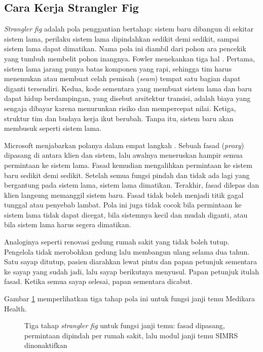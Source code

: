 \subsection{Cara Kerja Strangler Fig}

\textit{Strangler fig} adalah pola penggantian bertahap: sistem baru dibangun di sekitar sistem
lama, perilaku sistem lama dipindahkan sedikit demi sedikit, sampai sistem lama dapat dimatikan.
Nama pola ini diambil dari pohon ara pencekik yang tumbuh membelit pohon inangnya. Fowler menekankan
tiga hal \cite{c14-fowler-strangler}. Pertama, sistem lama jarang punya batas komponen yang rapi,
sehingga tim harus menemukan atau membuat celah pemisah (\textit{seam}) tempat satu bagian dapat
diganti tersendiri. Kedua, kode sementara yang membuat sistem lama dan baru dapat hidup berdampingan,
yang disebut arsitektur transisi, adalah biaya yang sengaja dibayar karena menurunkan risiko dan
mempercepat nilai. Ketiga, struktur tim dan budaya kerja ikut berubah. Tanpa itu, sistem baru akan
membusuk seperti sistem lama.

Microsoft menjabarkan polanya dalam empat langkah \cite{c14-azure-strangler}. Sebuah fasad
(\textit{proxy}) dipasang di antara klien dan sistem, lalu awalnya meneruskan hampir semua
permintaan ke sistem lama. Fasad kemudian mengalihkan permintaan ke sistem baru sedikit demi
sedikit. Setelah semua fungsi pindah dan tidak ada lagi yang bergantung pada sistem lama, sistem
lama dimatikan. Terakhir, fasad dilepas dan klien langsung memanggil sistem baru. Fasad tidak boleh
menjadi titik gagal tunggal atau penyebab lambat. Pola ini juga tidak cocok bila permintaan ke
sistem lama tidak dapat dicegat, bila sistemnya kecil dan mudah diganti, atau bila sistem lama harus
segera dimatikan.

Analoginya seperti renovasi gedung rumah sakit yang tidak boleh tutup. Pengelola tidak merobohkan
gedung lalu membangun ulang selama dua tahun. Satu sayap ditutup, pasien diarahkan lewat pintu dan
papan petunjuk sementara ke sayap yang sudah jadi, lalu sayap berikutnya menyusul. Papan petunjuk
itulah fasad. Ketika semua sayap selesai, papan sementara dicabut.

Gambar \ref{fig:ch14-strangler} memperlihatkan tiga tahap pola ini untuk fungsi janji temu
Medikara Health.

\begin{figure}[!htb]
  \centering
  
  \caption{Tiga tahap \textit{strangler fig} untuk fungsi janji temu: fasad dipasang, permintaan
           dipindah per rumah sakit, lalu modul janji temu SIMRS dinonaktifkan}
  \label{fig:ch14-strangler}
\end{figure}

